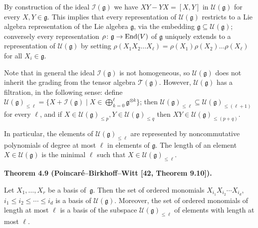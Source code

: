 By construction of the ideal $\mathcal{I}(\mathfrak{g})$ we have $XY-YX=[X,Y]$ in $\mathcal{U}(\mathfrak{g})$ for every $X,Y\in\mathfrak{g}$. This implies that every representation of $\mathcal{U}(\mathfrak{g})$ restricts to a Lie algebra representation of the Lie algebra $\mathfrak{g}$, via the embedding $\mathfrak{g}\subseteq\mathcal{U}(\mathfrak{g})$; conversely every representation $\rho\colon\mathfrak{g}\to\textnormal{End}(V)$ of $\mathfrak{g}$ uniquely extends to a representation of $\mathcal{U}(\mathfrak{g})$ by setting $\rho(X_{1}X_{2}\dots X_{\ell})=\rho(X_{1})\rho(X_{2})\dots\rho(X_{\ell})$ for all $X_{i}\in\mathfrak{g}$.





Note that in general the ideal $\mathcal{I}(\mathfrak{g})$ is not homogeneous, so $\mathcal{U}(\mathfrak{g})$ does not inherit the grading from the tensor algebra $\mathcal{T}(\mathfrak{g})$. However, $\mathcal{U}(\mathfrak{g})$ has a filtration, in the following sense: define $\mathcal{U}(\mathfrak{g})_{\leq\ell}=\{X+\mathcal{I}(\mathfrak{g})\mid X\in\bigoplus_{k=0}^{\ell}\mathfrak{g}^{\otimes k}\}$; then $\mathcal{U}(\mathfrak{g})_{\leq\ell}\subseteq\mathcal{U}(\mathfrak{g})_{\leq(\ell+1)}$ for every $\ell$, and if $X\in\mathcal{U}(\mathfrak{g})_{\leq p},Y\in\mathcal{U}(\mathfrak{g})_{\leq q}$ then $XY\in\mathcal{U}(\mathfrak{g})_{\leq(p+q)}$.





In particular, the elements of $\mathcal{U}(\mathfrak{g})_{\leq\ell}$ are represented by noncommutative polynomials of degree at most $\ell$ in elements of $\mathfrak{g}$.
The length of an element $X\in\mathcal{U}(\mathfrak{g})$ is the minimal $\ell$ such that $X\in\mathcal{U}(\mathfrak{g})_{\leq\ell}$.





\par\medskip\noindent\textbf{Theorem 4.9 (Poincaré–Birkhoff–Witt [42, Theorem 9.10]).}\par



Let $X_{1},\dots,X_{r}$ be a basis of $\mathfrak{g}$. Then the set of ordered monomials $X_{i_{1}}X_{i_{2}}\cdots X_{i_{d}}$, $i_{1}\leq i_{2}\leq\cdots\leq i_{d}$ is a basis of $\mathcal{U}(\mathfrak{g})$.
Moreover, the set of ordered monomials of length at most $\ell$ is a basis of the subspace $\mathcal{U}(\mathfrak{g})_{\leq\ell}$ of elements with length at most $\ell$.






